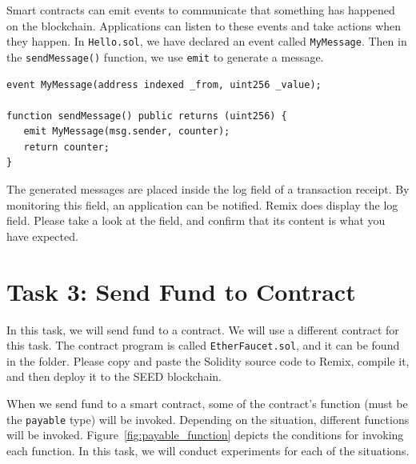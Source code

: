 Smart contracts can emit events to communicate that something has happened on the
blockchain. Applications can listen to these events and take actions 
when they happen. In \texttt{Hello.sol}, we have declared an
event called \texttt{MyMessage}. Then in the \texttt{sendMessage()}
function, we use \texttt{emit} to generate a message. 

\begin{lstlisting}
event MyMessage(address indexed _from, uint256 _value);

function sendMessage() public returns (uint256) {
   emit MyMessage(msg.sender, counter);
   return counter;
}
\end{lstlisting}


The generated messages are placed inside the log field of 
a transaction receipt. By monitoring this field, an application
can be notified. Remix does display the log field. Please 
take a look at the field, and confirm that its content is 
what you have expected. 
 





\section{Task 3: Send Fund to Contract} 

In this task, we will send fund to a contract. 
We will use a different contract for this task. 
The contract program is called \texttt{EtherFaucet.sol}, and 
it can be found in the \contractfolder folder.  
Please copy and paste the Solidity source code to Remix, 
compile it, and then deploy it to the SEED blockchain. 

When we send fund to a smart contract, some of the contract's 
function (must be the \texttt{payable} type) 
will be invoked. Depending on the situation, different 
functions will be invoked. Figure~\ref{fig:payable_function}
depicts the conditions for invoking each function. 
In this task, we will conduct experiments
for each of the situations. 

